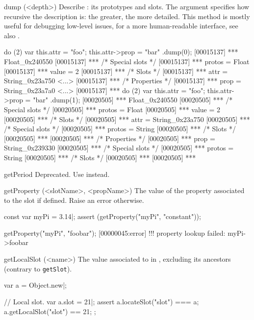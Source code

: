 \begin{urbiscriptapi}
\item[dump](<depth>)%
  Describe \this: its prototypes and slots.  The argument
   specifies how recursive the description is: the greater,
  the more detailed.  This method is mostly useful for debugging
  low-level issues, for a more human-readable interface, see also
  .
\begin{urbiscript}
do (2) { var this.attr = "foo"; this.attr->prop = "bar" }.dump(0);
[00015137] *** Float_0x240550 {
[00015137] ***   /* Special slots */
[00015137] ***   protos = Float
[00015137] ***   value = 2
[00015137] ***   /* Slots */
[00015137] ***   attr = String_0x23a750 <...>
[00015137] ***     /* Properties */
[00015137] ***     prop = String_0x23a7a0 <...>
[00015137] ***   }
do (2) { var this.attr = "foo"; this.attr->prop = "bar" }.dump(1);
[00020505] *** Float_0x240550 {
[00020505] ***   /* Special slots */
[00020505] ***   protos = Float
[00020505] ***   value = 2
[00020505] ***   /* Slots */
[00020505] ***   attr = String_0x23a750 {
[00020505] ***     /* Special slots */
[00020505] ***     protos = String
[00020505] ***     /* Slots */
[00020505] ***     }
[00020505] ***     /* Properties */
[00020505] ***     prop = String_0x239330 {
[00020505] ***       /* Special slots */
[00020505] ***       protos = String
[00020505] ***       /* Slots */
[00020505] ***       }
[00020505] ***   }
\end{urbiscript}

\item[getPeriod]
  Deprecated.  Use  instead.

\item[getProperty](<slotName>, <propName>)%
  The value of the  property associated to the slot
   if defined.  Raise an error otherwise.
\begin{urbiscript}
const var myPi = 3.14|;
assert (getProperty("myPi", "constant"));

getProperty("myPi", "foobar");
[00000045:error] !!! property lookup failed: myPi->foobar
\end{urbiscript}

\item[getLocalSlot](<name>)%
  The value associated to  in \this, excluding
  its ancestors (contrary to \lstinline|getSlot|).
\begin{urbiscript}
var a = Object.new|;

// Local slot.
var a.slot = 21|;
assert
{
  a.locateSlot("slot") === a;
  a.getLocalSlot("slot") == 21;
};


\end{urbiscript}
\end{urbiscriptapi}
